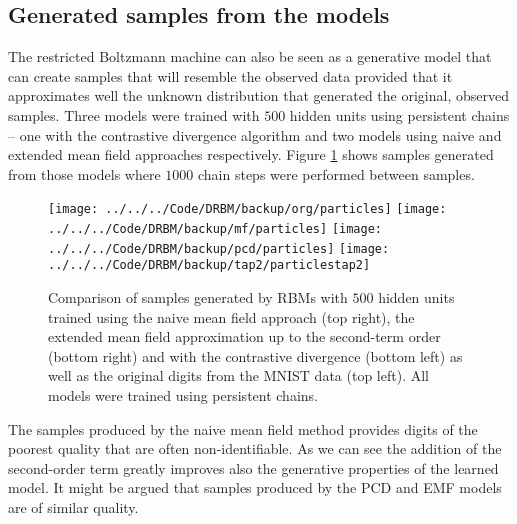 \subsection{Generated samples from the models}
The restricted Boltzmann machine can also be seen as a generative model that can create samples that will resemble the observed data provided that it approximates well the unknown distribution that generated the original, observed samples. Three models were trained with $500$ hidden units using persistent chains -- one with the contrastive divergence algorithm and two models using naive and extended mean field approaches respectively. Figure \ref{fig:particles} shows samples generated from those models where $1000$ chain steps were performed between samples.
\begin{figure}[!htb]
%
 \texttt{[image: ../../../Code/DRBM/backup/org/particles]}
\endminipage 
\hfill
{}  
 \texttt{[image: ../../../Code/DRBM/backup/mf/particles]}
\endminipage
\vspace{2em}
 \texttt{[image: ../../../Code/DRBM/backup/pcd/particles]}
\endminipage 
\hfill
{}  
 \texttt{[image: ../../../Code/DRBM/backup/tap2/particlestap2]}
\endminipage
  \caption[Generated samples from trained models]{Comparison of samples generated by RBMs with $500$ hidden units trained using the naive mean field approach (top right), the extended mean field approximation up to the second-term order (bottom right) and with the contrastive divergence (bottom left) as well as the original digits from the MNIST data (top left). All models were trained using persistent chains.}
  \label{fig:particles}
\end{figure}
The samples produced by the naive mean field method provides digits of the poorest quality that are often non-identifiable. As we can see the addition of the second-order term greatly improves also the generative properties of the learned model. It might be argued that samples produced by the PCD and EMF models are of similar quality.
